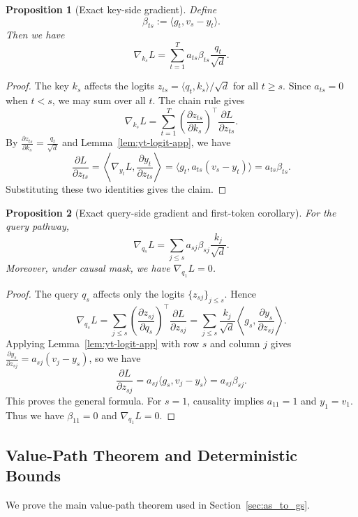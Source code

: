 \documentclass{article}
\theoremstyle{plain}
\newtheorem{proposition}{Proposition}
\theoremstyle{definition}
\theoremstyle{remark}
\begin{document}
\begin{proposition}[Exact key-side gradient]\label{prop:k-exact-app}
Define
\[
    \beta_{ts} := \langle g_t, v_s - y_t \rangle.
\]
Then we have
\[
    \nabla_{k_s} L = \sum_{t=1}^T a_{ts} \beta_{ts} \frac{q_t}{\sqrt{d}}.
\]
\end{proposition}
\begin{proof}
The key $k_s$ affects the logits $z_{ts} = \langle q_t, k_s \rangle / \sqrt{d}$ for all $t \ge s$. Since $a_{ts}=0$ when $t<s$, we may sum over all $t$. The chain rule gives
\[
    \nabla_{k_s} L
    = \sum_{t=1}^T \left(\frac{\partial z_{ts}}{\partial k_s}\right)^\top \frac{\partial L}{\partial z_{ts}}.
\]
By $\frac{\partial z_{ts}}{\partial k_s} = \frac{q_t}{\sqrt{d}}$ and Lemma~\ref{lem:yt-logit-app}, we have
\[
    \frac{\partial L}{\partial z_{ts}}
    = \left\langle \nabla_{y_t} L, \frac{\partial y_t}{\partial z_{ts}} \right\rangle
    = \langle g_t, a_{ts}(v_s - y_t) \rangle
    = a_{ts} \beta_{ts}.
\]
Substituting these two identities gives the claim.
\end{proof}

\begin{proposition}[Exact query-side gradient and first-token corollary]\label{prop:q-exact-app}
For the query pathway,
\[
    \nabla_{q_s} L = \sum_{j \le s} a_{sj} \beta_{sj} \frac{k_j}{\sqrt{d}}.
\]
Moreover, under causal mask, we have $\nabla_{q_1} L = 0$.
\end{proposition}
\begin{proof}
The query $q_s$ affects only the logits $\{z_{sj}\}_{j \le s}$. Hence
\[
    \nabla_{q_s} L
    = \sum_{j \le s} \left(\frac{\partial z_{sj}}{\partial q_s}\right)^\top \frac{\partial L}{\partial z_{sj}}
    = \sum_{j \le s} \frac{k_j}{\sqrt{d}} \left\langle g_s, \frac{\partial y_s}{\partial z_{sj}} \right\rangle.
\]
Applying Lemma~\ref{lem:yt-logit-app} with row $s$ and column $j$ gives $\frac{\partial y_s}{\partial z_{sj}} = a_{sj}(v_j - y_s)$, so we have
\[
    \frac{\partial L}{\partial z_{sj}} = a_{sj} \langle g_s, v_j - y_s \rangle = a_{sj} \beta_{sj}.
\]
This proves the general formula.
For $s=1$, causality implies $a_{11}=1$ and $y_1=v_1$. Thus we have $\beta_{11}=0$ and $\nabla_{q_1}L=0$.
\end{proof}

\subsection{Value-Path Theorem and Deterministic Bounds}\label{app:theory:vside}
We prove the main value-path theorem used in Section~\ref{sec:as_to_gs}.
\end{document}

